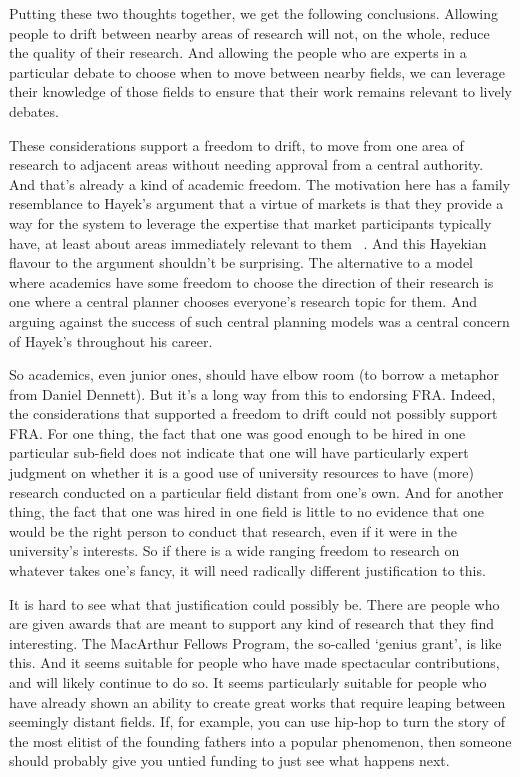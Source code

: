 Putting these two thoughts together, we get the following conclusions. Allowing people to drift between nearby areas of research will not, on the whole, reduce the quality of their research. And allowing the people who are experts in a particular debate to choose when to move between nearby fields, we can leverage their knowledge of those fields to ensure that their work remains relevant to lively debates. 

These considerations support a freedom to drift, to move from one area of research to adjacent areas without needing approval from a central authority. And that's already a kind of academic freedom. The motivation here has a family resemblance to Hayek's argument that a virtue of markets is that they provide a way for the system to leverage the expertise that market participants typically have, at least about areas immediately relevant to them ~\citep{Hayek1945}. And this Hayekian flavour to the argument shouldn't be surprising. The alternative to a model where academics have some freedom to choose the direction of their research is one where a central planner chooses everyone's research topic for them. And arguing against the success of such central planning models was a central concern of Hayek's throughout his career.

So academics, even junior ones, should have elbow room (to borrow a metaphor from Daniel Dennett). But it's a long way from this to endorsing FRA. Indeed, the considerations that supported a freedom to drift could not possibly support FRA. For one thing, the fact that one was good enough to be hired in one particular sub-field does not indicate that one will have particularly expert judgment on whether it is a good use of university resources to have (more) research conducted on a particular field distant from one's own. And for another thing, the fact that one was hired in one field is little to no evidence that one would be the right person to conduct that research, even if it were in the university's interests. So if there is a wide ranging freedom to research on whatever takes one's fancy, it will need radically different justification to this.

It is hard to see what that justification could possibly be. There are people who are given awards that are meant to support any kind of research that they find interesting. The MacArthur Fellows Program, the so-called `genius grant', is like this. And it seems suitable for people who have made spectacular contributions, and will likely continue to do so. It seems particularly suitable for people who have already shown an ability to create great works that require leaping between seemingly distant fields. If, for example, you can use hip-hop to turn the story of the most elitist of the founding fathers into a popular phenomenon, then someone should probably give you untied funding to just see what happens next. 

